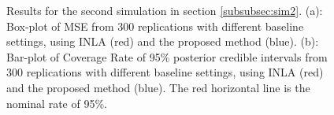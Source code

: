 \documentclass[ba]{imsart}
\begin{document}
\begin{table}
  \begin{center}
  \end{center}
  \caption{KS statistic for each parameter in the first simulation study in section \ref{subsubsec:sim1}, to compare the proposed approach with MCMC.}
  \label{table:Sim1KS}
  \end{table}






\begin{figure}
\centering
{}
\caption{Results for the second simulation in section \ref{subsubsec:sim2}. (a): Box-plot of MSE from 300 replications with different baseline settings, using INLA (red) and the proposed method (blue). (b): Bar-plot of Coverage Rate of 95\% posterior credible intervals from 300 replications with different baseline settings, using INLA (red) and the proposed method (blue). The red horizontal line is the nominal rate of 95\%. }
\label{fig:Sim2Plot}
\end{figure}
\end{document}
